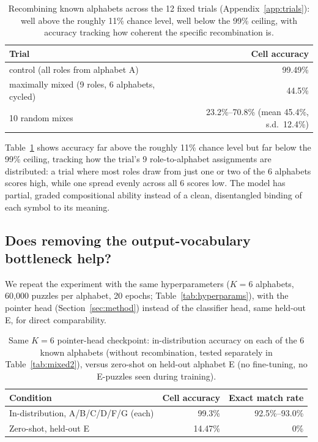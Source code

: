 \documentclass{article} %
\begin{document}
\begin{table}[h]
\centering
\footnotesize
\begin{tabular}{lr}
\hline
Trial & Cell accuracy \\
\hline
control (all roles from alphabet A) & 99.49\% \\
maximally mixed (9 roles, 6 alphabets, cycled) & 44.5\% \\
10 random mixes & 23.2\%--70.8\% (mean 45.4\%, s.d.\ 12.4\%) \\
\hline
\end{tabular}
\caption{Recombining known alphabets across the 12 fixed trials
(Appendix~\ref{app:trials}): well above the roughly 11\% chance level,
well below the 99\% ceiling, with accuracy tracking how coherent the
specific recombination is.}
\label{tab:mixed1}
\end{table}

Table~\ref{tab:mixed1} shows accuracy far above the roughly 11\% chance
level but far below the 99\% ceiling, tracking how the trial's 9
role-to-alphabet assignments are distributed: a trial where most roles
draw from just one or two of the 6 alphabets scores high, while one
spread evenly across all 6 scores low. The model has partial, graded
compositional ability instead of a clean, disentangled binding of each
symbol to its meaning.

\subsection{Does removing the output-vocabulary bottleneck help?}
\label{sec:pointer}

We repeat the experiment with the same hyperparameters ($K=6$
alphabets, 60{,}000 puzzles per alphabet, 20 epochs;
Table~\ref{tab:hyperparams}), with the
pointer head (Section~\ref{sec:method}) instead of the classifier head,
same held-out E, for direct comparability.

\begin{table}[h]
\centering
\footnotesize
\begin{tabular}{lrr}
\hline
Condition & Cell accuracy & Exact match rate \\
\hline
In-distribution, A/B/C/D/F/G (each) & 99.3\% & 92.5\%--93.0\% \\
Zero-shot, held-out E & 14.47\% & 0\% \\
\hline
\end{tabular}
\caption{Same $K=6$ pointer-head checkpoint: in-distribution accuracy on
each of the 6 known alphabets (without recombination, tested separately
in Table~\ref{tab:mixed2}), versus zero-shot on held-out alphabet E (no
fine-tuning, no E-puzzles seen during training).}
\label{tab:pointer-gate}
\end{table}
\end{document}
